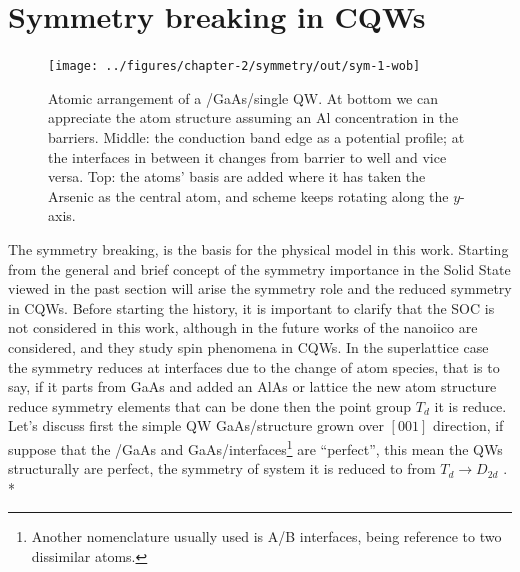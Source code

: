 \section{Symmetry breaking in CQWs}
\label{subsec:chapter-2-symmetry-breaking}
\vspace{-10mm}
\begin{figure}[ht!]
	\centering
		\texttt{[image: ../figures/chapter-2/symmetry/out/sym-1-wob]}
	\caption{
Atomic arrangement of a \algaas/GaAs/\algaas single \gls{QW}. At bottom we can appreciate the atom structure assuming
an Al concentration in the barriers. Middle: the conduction band edge as a potential profile; at the interfaces in between it changes from barrier to well and vice versa. Top: the atoms' basis are added where it has taken the Arsenic as the central atom, and scheme keeps rotating along the $y$-axis.
}
\label{fig:subsubsection-2.2-qws-symmetry}
\end{figure}
The symmetry breaking, is the basis for the physical model in this work. Starting from the general and brief concept of the symmetry importance in the Solid State viewed in the past section will arise the symmetry role and the reduced symmetry in \gls{CQWs}. Before starting the history, it is important to clarify that the SOC is not considered in this work, although in the future works of the \gls{nanoiico} are considered, and they study spin phenomena in \gls{CQWs}. 
In the superlattice case the symmetry reduces at interfaces due to the change of atom species, that is to say, if it parts from GaAs and added an AlAs or \algaas lattice the new atom structure reduce symmetry elements that can be done then the point group $T_{d}$ it is reduce. 
Let's discuss first the simple QW GaAs/\algaas structure grown over $\left[001\right]$ direction, if suppose that the \algaas/GaAs and GaAs/\algaas interfaces\footnote{Another nomenclature usually used is A/B interfaces, being reference to two dissimilar atoms.} are ``perfect'', this mean the \gls{QW}s structurally are perfect,  the symmetry of system it is reduced to from $T_{d}\to D_{2d}$ \cite{magri2000anticrossing,ivchenko1996heavylight}.  \\*
